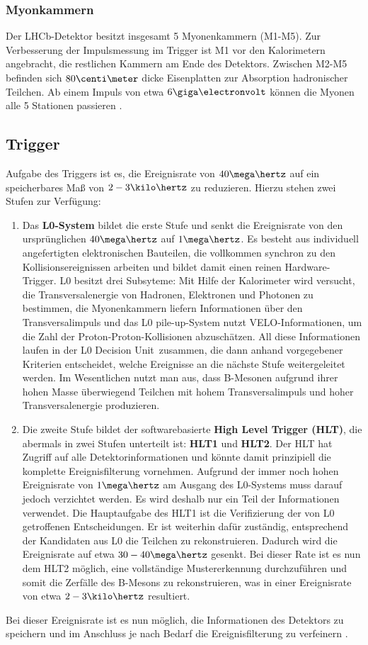 \subsubsection{Myonkammern}
Der LHCb-Detektor besitzt insgesamt 5 Myonenkammern (M1-M5). Zur Verbesserung der Impulsmessung im Trigger ist M1 vor den Kalorimetern angebracht, die restlichen Kammern am Ende des Detektors. Zwischen M2-M5 befinden sich $80\centi\meter$ dicke Eisenplatten zur Absorption hadronischer Teilchen. Ab einem Impuls von etwa $6\giga\electronvolt$ können die Myonen alle 5 Stationen passieren \cite{thesis_linn}.

\subsection{Trigger}
Aufgabe des Triggers ist es, die Ereignisrate von $40\mega\hertz$ auf ein speicherbares Maß von $2-3\kilo\hertz$ zu reduzieren. Hierzu stehen zwei Stufen zur Verfügung:
\begin{enumerate}
    \item Das \textbf{L0-System} bildet die erste Stufe und senkt die Ereignisrate von den ursprünglichen $40\mega\hertz$ auf $1\mega\hertz$. Es besteht aus individuell angefertigten elektronischen Bauteilen, die vollkommen synchron zu den Kollisionsereignissen arbeiten und bildet damit einen reinen Hardware-Trigger. L0 besitzt drei Subsyteme: Mit Hilfe der Kalorimeter wird versucht, die Transversalenergie von Hadronen, Elektronen und Photonen zu bestimmen, die Myonenkammern liefern Informationen über den Transversalimpuls und das \glqq L0 pile-up\grqq-System nutzt VELO-Informationen, um die Zahl der Proton-Proton-Kollisionen abzuschätzen. All diese Informationen laufen in der \glqq L0 Decision Unit\grqq\ zusammen, die dann anhand vorgegebener Kriterien entscheidet, welche Ereignisse an die nächste Stufe weitergeleitet werden. Im Wesentlichen nutzt man aus, dass B-Mesonen aufgrund ihrer hohen Masse überwiegend Teilchen mit hohem Transversalimpuls und hoher Transversalenergie produzieren.
    \item Die zweite Stufe bildet der softwarebasierte \textbf{High Level Trigger (HLT)}, die abermals in zwei Stufen unterteilt ist: \textbf{HLT1} und \textbf{HLT2}. Der HLT hat Zugriff auf alle Detektorinformationen und könnte damit prinzipiell die komplette Ereignisfilterung vornehmen. Aufgrund der immer noch hohen Ereignisrate von $1\mega\hertz$ am Ausgang des L0-Systems muss darauf jedoch verzichtet werden. Es wird deshalb nur ein Teil der Informationen verwendet. Die Hauptaufgabe des HLT1 ist die Verifizierung der von L0 getroffenen Entscheidungen. Er ist weiterhin dafür zuständig, entsprechend der Kandidaten aus L0 die Teilchen zu rekonstruieren. Dadurch wird die Ereignisrate auf etwa $30-40\mega\hertz$ gesenkt. Bei dieser Rate ist es nun dem HLT2 möglich, eine vollständige Mustererkennung durchzuführen und somit die Zerfälle des B-Mesons zu rekonstruieren, was in einer Ereignisrate von etwa $2-3\kilo\hertz$ resultiert. 
\end{enumerate}
Bei dieser Ereignisrate ist es nun möglich, die Informationen des Detektors zu speichern und im Anschluss je nach Bedarf die Ereignisfilterung zu verfeinern \cite{detector}.